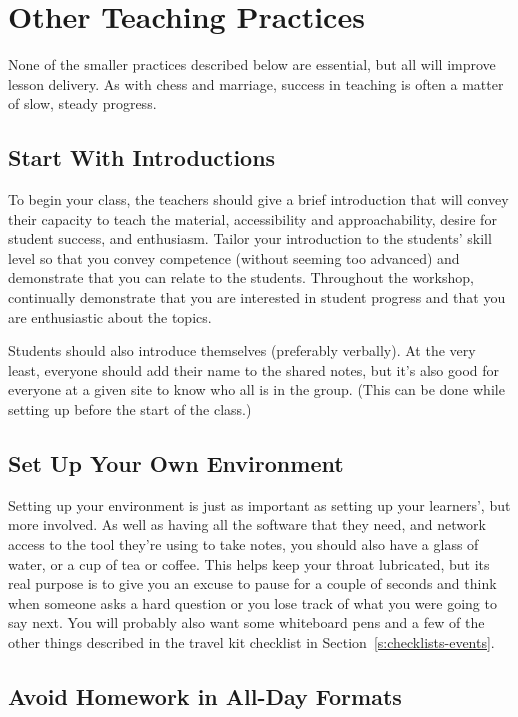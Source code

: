 \section{Other Teaching Practices}\label{s:classroom-practices}

None of the smaller practices described below are essential, but all
will improve lesson delivery. As with chess and marriage, success in
teaching is often a matter of slow, steady progress.

\subsection*{Start With Introductions}

To begin your class, the teachers should give a brief introduction that
will convey their capacity to teach the material, accessibility and
approachability, desire for student success, and enthusiasm. Tailor your
introduction to the students' skill level so that you convey competence
(without seeming too advanced) and demonstrate that you can relate to
the students. Throughout the workshop, continually demonstrate that you
are interested in student progress and that you are enthusiastic about
the topics.

Students should also introduce themselves (preferably verbally). At the
very least, everyone should add their name to the shared notes, but it's
also good for everyone at a given site to know who all is in the group.
(This can be done while setting up before the start of the class.)

\subsection*{Set Up Your Own Environment}

Setting up your environment is just as important as setting up your
learners', but more involved. As well as having all the software that
they need, and network access to the tool they're using to take notes,
you should also have a glass of water, or a cup of tea or coffee. This
helps keep your throat lubricated, but its real purpose is to give you
an excuse to pause for a couple of seconds and think when someone asks a
hard question or you lose track of what you were going to say next. You
will probably also want some whiteboard pens and a few of the other
things described in the travel kit checklist in Section~\ref{s:checklists-events}.

\subsection*{Avoid Homework in All-Day Formats}

